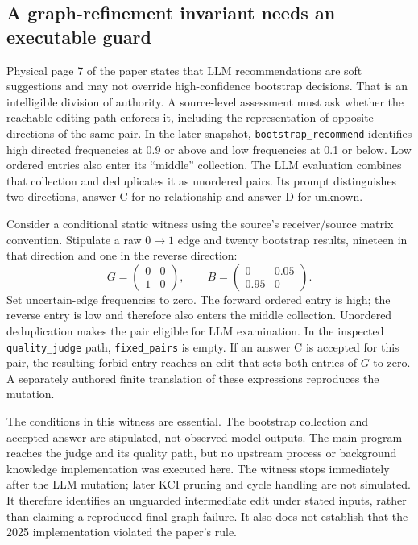 \subsection{A graph-refinement invariant needs an executable guard}

Physical page 7 of the paper states that LLM recommendations are soft
suggestions and may not override high-confidence bootstrap decisions. That
is an intelligible division of authority. A source-level assessment must ask
whether the reachable editing path enforces it, including the representation
of opposite directions of the same pair. In the later snapshot,
\texttt{bootstrap\_recommend} identifies high directed frequencies at 0.9 or
above and low frequencies at 0.1 or below. Low ordered entries also enter its
``middle'' collection. The LLM evaluation combines that collection and
deduplicates it as unordered pairs. Its prompt distinguishes two directions,
answer C for no relationship and answer D for unknown.
\citep{exec17_copilot_paper,exec17_copilot_code}

Consider a conditional static witness using the source's receiver/source
matrix convention. Stipulate a raw $0\to1$ edge and twenty bootstrap results,
nineteen in that direction and one in the reverse direction:
\begin{equation}
 G=\begin{pmatrix}0&0\\1&0\end{pmatrix},\qquad
 B=\begin{pmatrix}0&0.05\\0.95&0\end{pmatrix}.
 \label{exec17:copilot-edit-input}
\end{equation}
Set uncertain-edge frequencies to zero. The forward ordered entry is high;
the reverse entry is low and therefore also enters the middle collection.
Unordered deduplication makes the pair eligible for LLM examination. In the
inspected \texttt{quality\_judge} path, \texttt{fixed\_pairs} is empty. If an
answer C is accepted for this pair, the resulting forbid entry reaches an edit
that sets both entries of $G$ to zero. A separately authored finite translation
of these expressions reproduces the mutation.
\citep{exec17_copilot_code,exec17_copilot_exact}

The conditions in this witness are essential. The bootstrap collection and
accepted answer are stipulated, not observed model outputs. The main program
reaches the judge and its quality path, but no upstream process or background
knowledge implementation was executed here. The witness stops immediately
after the LLM mutation; later KCI pruning and cycle handling are not simulated.
It therefore identifies an unguarded intermediate edit under stated inputs,
rather than claiming a reproduced final graph failure. It also does not
establish that the 2025 implementation violated the paper's rule.
\citep{exec17_copilot_code,exec17_copilot_exact}

